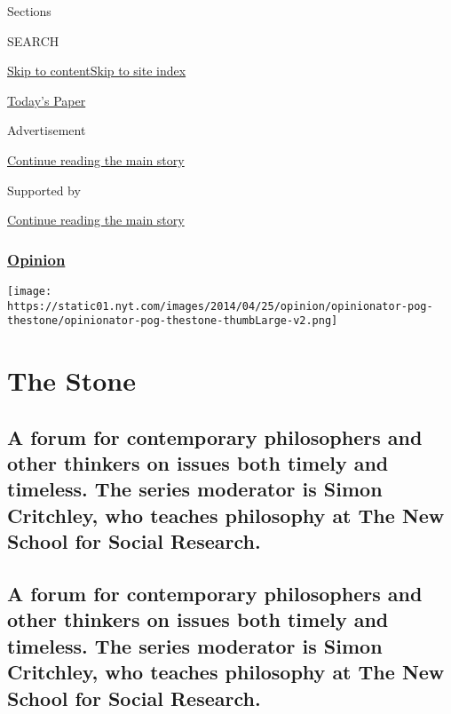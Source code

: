 Sections

SEARCH

\protect\hyperlink{site-content}{Skip to
content}\protect\hyperlink{site-index}{Skip to site index}

\href{https://myaccount.nytimes.com/auth/login?response_type=cookie\&client_id=vi}{}

\href{https://www.nytimes.com/section/todayspaper}{Today's Paper}

Advertisement

\protect\hyperlink{after-top}{Continue reading the main story}

Supported by

\protect\hyperlink{after-sponsor}{Continue reading the main story}

\hypertarget{opinion}{%
\subsubsection{\texorpdfstring{\href{/section/opinion}{Opinion}}{Opinion}}\label{opinion}}

\texttt{[image: https://static01.nyt.com/images/2014/04/25/opinion/opinionator-pog-thestone/opinionator-pog-thestone-thumbLarge-v2.png]}

\hypertarget{the-stone}{%
\section{The Stone}\label{the-stone}}

\hypertarget{a-forum-for-contemporary-philosophers-and-other-thinkers-on-issues-both-timely-and-timeless-the-series-moderator-is-simon-critchley-who-teaches-philosophy-at-the-new-school-for-social-research}{%
\subsection{A forum for contemporary philosophers and other thinkers on
issues both timely and timeless. The series moderator is Simon
Critchley, who teaches philosophy at The New School for Social
Research.}\label{a-forum-for-contemporary-philosophers-and-other-thinkers-on-issues-both-timely-and-timeless-the-series-moderator-is-simon-critchley-who-teaches-philosophy-at-the-new-school-for-social-research}}

\hypertarget{a-forum-for-contemporary-philosophers-and-other-thinkers-on-issues-both-timely-and-timeless-the-series-moderator-is-simon-critchley-who-teaches-philosophy-at-the-new-school-for-social-research-1}{%
\subsection{A forum for contemporary philosophers and other thinkers on
issues both timely and timeless. The series moderator is Simon
Critchley, who teaches philosophy at The New School for Social
Research.}\label{a-forum-for-contemporary-philosophers-and-other-thinkers-on-issues-both-timely-and-timeless-the-series-moderator-is-simon-critchley-who-teaches-philosophy-at-the-new-school-for-social-research-1}}

